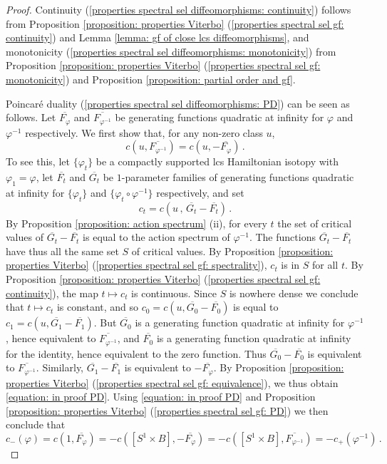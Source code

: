 \documentclass{amsart}
\theoremstyle{remark}
\begin{document}
\begin{proof}
Continuity (\ref{properties spectral sel diffeomorphisms: continuity})
follows from Proposition \ref{proposition: properties Viterbo}
(\ref{properties spectral sel gf: continuity})
and Lemma \ref{lemma: gf of close lcs diffeomorphisms},
and monotonicity (\ref{properties spectral sel diffeomorphisms: monotonicity})
from Proposition \ref{proposition: properties Viterbo}
(\ref{properties spectral sel gf: monotonicity})
and Proposition \ref{proposition: partial order and gf}.

Poincar\'e duality (\ref{properties spectral sel diffeomorphisms: PD})
can be seen as follows.
Let $\overline{F_{\varphi}}$ and $\overline{F_{\varphi^{-1}}}$
be generating functions quadratic at infinity
for $\varphi$ and $\varphi^{-1}$ respectively.
We first show that,
for any non-zero class $u$,
\begin{equation}\label{equation: in proof PD}
c (u, \overline{F_{\varphi^{-1}}}) = c (u, - \overline{F_{\varphi}}) \,.    
\end{equation}
To see this,
let $\{\varphi_t\}$ be a compactly supported lcs Hamiltonian isotopy
with $\varphi_1 = \varphi$,
let $\overline{F_t}$ and $\overline{G_t}$
be $1$-parameter families of generating functions quadratic at infinity
for $\{\varphi_t\}$ and $\{\varphi_t \circ \varphi^{-1}\}$ respectively,
and set
\[
c_t = c (u \,,\, \overline{G_t} - \overline{F_t}) \,.
\]
By Proposition \ref{proposition: action spectrum} (ii),
for every $t$ the set of critical values
of $\overline{G_t} - \overline{F_t}$
is equal to the action spectrum of $\varphi^{-1}$.
The functions $\overline{G_t} - \overline{F_t}$
have thus all the same set $S$ of critical values.
By Proposition \ref{proposition: properties Viterbo}
(\ref{properties spectral sel gf: spectrality}),
$c_t$ is in $S$ for all $t$.
By Proposition \ref{proposition: properties Viterbo}
(\ref{properties spectral sel gf: continuity}),
the map $t \mapsto c_t$ is continuous.
Since $S$ is nowhere dense
we conclude that $t \mapsto c_t$ is constant,
and so $c_0 = c (u, \overline{G_0} - \overline{F_0})$
is equal to $c_1 = c (u, \overline{G_1} - \overline{F_1})$.
But $\overline{G_0}$
is a generating function quadratic at infinity for $\varphi^{-1}$,
hence equivalent to $\overline{F_{\varphi^{-1}}}$,
and $\overline{F_0}$
is a generating function quadratic at infinity for the identity,
hence equivalent to the zero function.
Thus $\overline{G_0} - \overline{F_0}$
is equivalent to $\overline{F_{\varphi^{-1}}}$.
Similarly,
$\overline{G_1} - \overline{F_1}$
is equivalent to $- \overline{F_{\varphi}}$.
By Proposition \ref{proposition: properties Viterbo}
(\ref{properties spectral sel gf: equivalence}),
we thus obtain \eqref{equation: in proof PD}.
Using \eqref{equation: in proof PD}
and Proposition \ref{proposition: properties Viterbo} (\ref{properties spectral sel gf: PD})
we then conclude that
\[
c_-(\varphi) = c (1, \overline{F_{\varphi}})
= - c ([S^1 \times B], - \overline{F_{\varphi}})
= - c ([S^1 \times B], \overline{F_{\varphi^{-1}}})
= - c_+ (\varphi^{-1}) \,.
\]


\end{proof}
\end{document}
